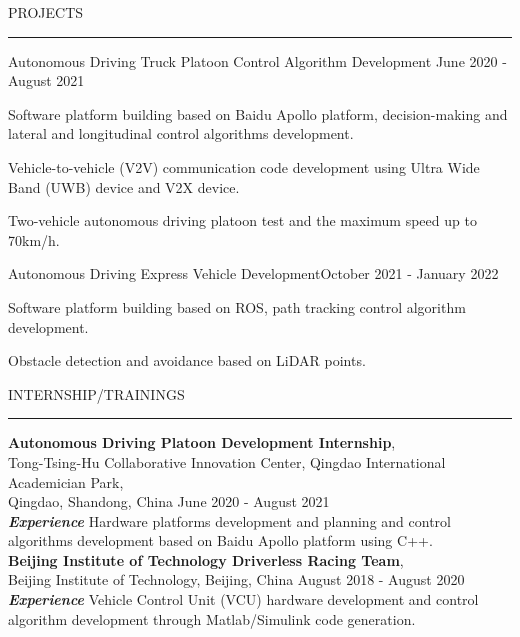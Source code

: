 \documentclass{resume} %
\renewenvironment{rSection}[1]{
\sectionskip
\textcolor{TsinghuaPurple}{\MakeUppercase{#1}}
\sectionlineskip
\hrule
\begin{list}{}{
\setlength{\leftmargin}{0em}
}
\item[]
}{
\end{list}
}
\begin{document}

\begin{rSection}{PROJECTS}

\begin{rSubsection}{Autonomous Driving Truck Platoon Control Algorithm Development} {June 2020 - August 2021}{}{}

\item Software platform building based on Baidu Apollo platform, decision-making and lateral and longitudinal control algorithms development.
\item Vehicle-to-vehicle (V2V) communication code development using Ultra Wide Band (UWB) device and V2X device.
\item Two-vehicle autonomous driving platoon test and the maximum speed up to 70km/h.
 
\end{rSubsection}  


\begin{rSubsection}{Autonomous Driving Express Vehicle Development}{October 2021 - January 2022}{}{} 
\item Software platform building based on ROS, path tracking control algorithm development.
\item Obstacle detection and avoidance based on LiDAR points.

\end{rSubsection}

\end{rSection} 



\begin{rSection}{INTERNSHIP/TRAININGS} \itemsep -3pt  

{\textbf{Autonomous Driving Platoon Development Internship}, \\ Tong-Tsing-Hu Collaborative Innovation Center, Qingdao International Academician Park,\\ Qingdao, Shandong, China}  \hfill  June 2020 - August 2021 \\
\textbf{\textit{Experience}}
Hardware platforms development and planning and control algorithms development based on Baidu Apollo platform using C++.
\\
{\textbf{Beijing Institute of Technology Driverless Racing Team}, 
\\Beijing Institute of Technology, Beijing, China} \hfill August 2018 - August 2020 \\     
\textbf{\textit{Experience}} Vehicle Control Unit (VCU) hardware development and control algorithm development through Matlab/Simulink code generation.

\end{rSection}  
 
\end{document}
